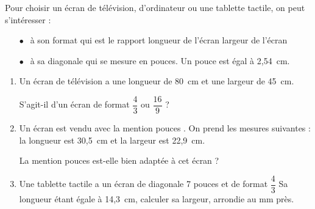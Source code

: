 
\bigskip

Pour choisir un écran de télévision, d'ordinateur ou une tablette tactile, on peut s'intéresser : 
\setlength\parindent{5mm}
\begin{itemize}
\item[$\bullet~~$] à son format qui est le rapport longueur de l'écran largeur de l'écran 
\item[$\bullet~~$] à sa diagonale qui se mesure en pouces. Un pouce est égal à 2,54~cm.
\end{itemize}
\setlength\parindent{0mm}

\medskip
 
\begin{enumerate}
\item Un écran de télévision a une longueur de 80~cm et une largeur de 45~cm.
 
S'agit-il d'un écran de format $\dfrac{4}{3}$ ou $\dfrac{16}{9}$ ? 
\item Un écran est vendu avec la mention  pouces \fg. On prend les mesures suivantes : la longueur est 30,5~cm et la largeur est 22,9~cm. 

La mention  pouces \fg{} est-elle bien adaptée à cet écran ? 
\item Une tablette tactile a un écran de diagonale 7 pouces et de format $\dfrac{4}{3}$ 
Sa longueur étant égale à 14,3~cm, calculer sa largeur, arrondie au mm près.
\end{enumerate}
 
\bigskip
 
